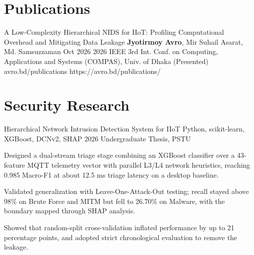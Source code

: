 \documentclass[11pt, a4paper]{article}
\begin{document}

\section{Publications}
\cvPublication
    {A Low-Complexity Hierarchical NIDS for IIoT: Profiling Computational Overhead and Mitigating Data Leakage}
    {\textbf{Jyotirmoy Avro}, Mir Suhail Asarat, Md. Samsuzzaman}
    {Oct 2026}
    {2026 IEEE 3rd Int. Conf. on Computing, Applications and Systems (COMPAS), Univ. of Dhaka (Presented)}
    {avro.bd/publications}
    {https://avro.bd/publications/}


\section{Security Research}
\cvProject
    {Hierarchical Network Intrusion Detection System for IIoT}
    {Python, scikit-learn, XGBoost, DCNv2, SHAP}
    {2026}
    {Undergraduate Thesis, PSTU}
    {
        \item Designed a dual-stream triage stage combining an XGBoost classifier over a 43-feature MQTT telemetry vector with parallel L3/L4 network heuristics, reaching 0.985 Macro-F1 at about 12.5 ms triage latency on a desktop baseline.
        \item Validated generalization with Leave-One-Attack-Out testing; recall stayed above 98\% on Brute Force and MITM but fell to 26.70\% on Malware, with the boundary mapped through SHAP analysis.
        \item Showed that random-split cross-validation inflated performance by up to 21 percentage points, and adopted strict chronological evaluation to remove the leakage.
    }

\end{document}
